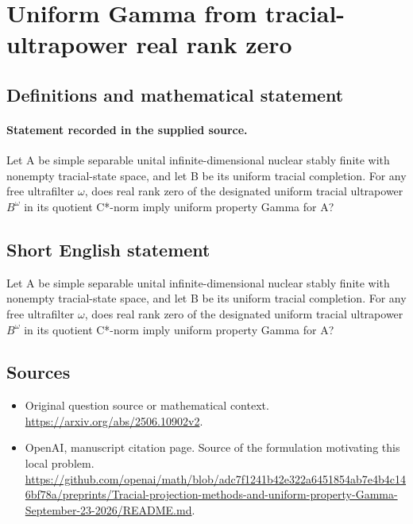 \documentclass[11pt]{article}
\begin{document}
\section*{Uniform Gamma from tracial-ultrapower real rank zero}\label{30007312}
\subsection{Definitions and mathematical statement}
\paragraph{Statement recorded in the supplied source.}
Let A be simple separable unital infinite-dimensional nuclear stably finite with nonempty tracial-state space, and let B be its uniform tracial completion. For any free ultrafilter $\omega $, does real rank zero of the designated uniform tracial ultrapower $B^\omega $ in its quotient C*-norm imply uniform property Gamma for A?
\subsection{Short English statement}
Let A be simple separable unital infinite-dimensional nuclear stably finite with nonempty tracial-state space, and let B be its uniform tracial completion. For any free ultrafilter $\omega $, does real rank zero of the designated uniform tracial ultrapower $B^\omega $ in its quotient C*-norm imply uniform property Gamma for A?
\subsection{Sources}
\begin{itemize}
\item[S1] Original question source or mathematical context.
\url{https://arxiv.org/abs/2506.10902v2}.
\item[S2] OpenAI, manuscript citation page. Source of the formulation motivating this local problem.
\url{https://github.com/openai/math/blob/adc7f1241b42e322a6451854ab7e4b4c146bf78a/preprints/Tracial-projection-methods-and-uniform-property-Gamma-September-23-2026/README.md}.
\end{itemize}
\end{document}
